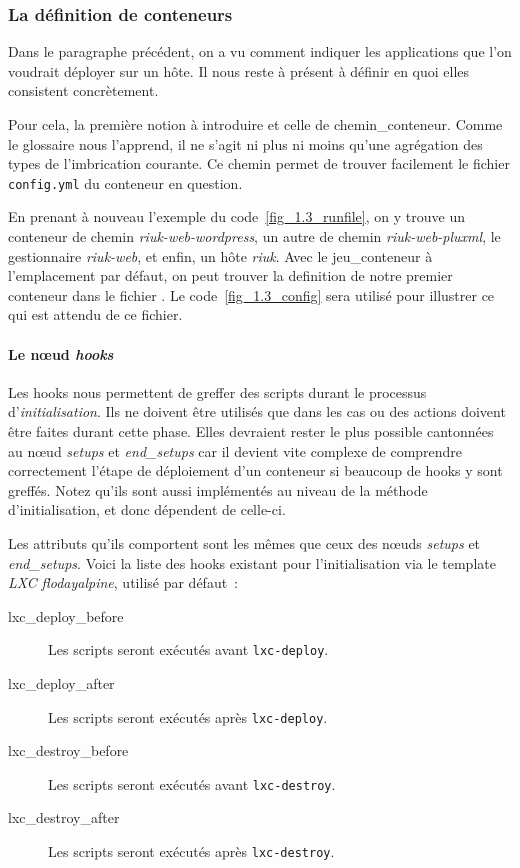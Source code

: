 \subsubsection{La définition de conteneurs}

Dans le paragraphe précédent, on a vu comment indiquer les \glspl{application} que l'on voudrait déployer sur un hôte.
Il nous reste à présent à définir en quoi elles consistent concrètement.

Pour cela, la première notion à introduire et celle de \gls{chemin_conteneur}.
Comme le glossaire nous l'apprend, il ne s'agit ni plus ni moins qu'une agrégation des types de l'\gls{imbrication} courante.
Ce chemin permet de trouver facilement le fichier {\tt config.yml} du conteneur en question.

En prenant à nouveau l'exemple du code~\ref{fig_1.3_runfile}, on y trouve un conteneur de chemin \emph{riuk-web-wordpress}, un autre de chemin \emph{riuk-web-pluxml}, le gestionnaire \emph{riuk-web}, et enfin, un hôte \emph{riuk}.
Avec le \gls{jeu_conteneur} à l'emplacement par défaut, on peut trouver la \gls{definition} de notre premier conteneur dans le fichier .
Le code~\ref{fig_1.3_config} sera utilisé pour illustrer ce qui est attendu de ce fichier.



\paragraph{Le nœud \emph{hooks}}

Les hooks nous permettent de greffer des scripts durant le processus d'\emph{initialisation}.
Ils ne doivent être utilisés que dans les cas ou des actions doivent être faites durant cette phase.
Elles devraient rester le plus possible cantonnées au nœud \emph{setups} et \emph{end\_setups} car il devient vite complexe de comprendre correctement l'étape de déploiement d'un conteneur si beaucoup de hooks y sont greffés.
Notez qu'ils sont aussi implémentés au niveau de la méthode d'\gls{initialisation}, et donc dépendent de celle-ci.

Les attributs qu'ils comportent sont les mêmes que ceux des nœuds \emph{setups} et \emph{end\_setups}.
Voici la liste des hooks existant pour l'initialisation via le template \emph{LXC} \emph{flodayalpine}, utilisé par défaut~:

\begin{description}
	\item[lxc\_deploy\_before] Les scripts seront exécutés avant {\tt lxc-deploy}.
	\item[lxc\_deploy\_after] Les scripts seront exécutés après {\tt lxc-deploy}.
	\item[lxc\_destroy\_before] Les scripts seront exécutés avant {\tt lxc-destroy}.
	\item[lxc\_destroy\_after] Les scripts seront exécutés après {\tt lxc-destroy}.
\end{description}

